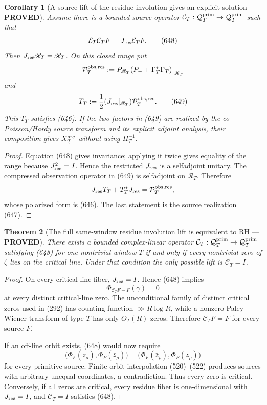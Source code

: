 \documentclass[11pt]{article}
\newtheorem{theorem}{Theorem}
\newtheorem{corollary}[theorem]{Corollary}
\newcommand{\PROVED}{\textcolor{green!45!black}{\textbf{PROVED}}}
\begin{document}
\begin{corollary}[A source lift of the residue involution gives an explicit
solution --- \PROVED]
Assume there is a bounded source operator
\(\mathcal C_T:\mathcal Q_T^{\rm prim}\to
\mathcal Q_T^{\rm prim}\) such that
\begin{equation}
 \mathcal E_T\mathcal C_TF
 =J_{\rm res}\mathcal E_TF.                          \tag{648}
\end{equation}
Then \(J_{\rm res}\mathscr R_T=\mathscr R_T\).  On this closed range put
\[
 \mathcal P_T^{\rm obs,res}:=
 P_{\mathscr R_T}
 (P_-+\Gamma_T^*\Gamma_T)\big|_{\mathscr R_T}
\]
and
\begin{equation}
 T_T:=\frac12
 (J_{\rm res}|_{\mathscr R_T})
 \mathcal P_T^{\rm obs,res}.                         \tag{649}
\end{equation}
This \(T_T\) satisfies (646).  If the two factors in (649) are realized by
the co-Poisson/Hardy source transform and its explicit adjoint analysis,
their composition gives \(X_T^{\rm src}\) without using \(H_T^{-1}\).
\end{corollary}

\begin{proof}
Equation (648) gives invariance; applying it twice gives equality of the
range because \(J_{\rm res}^2=I\).  Hence the restricted \(J_{\rm res}\)
is a selfadjoint unitary.  The compressed observation operator in (649) is
selfadjoint on \(\mathscr R_T\).  Therefore
\[
 J_{\rm res}T_T+T_T^*J_{\rm res}
 =\mathcal P_T^{\rm obs,res},
\]
whose polarized form is (646).  The last statement is the source
realization (647).
\end{proof}

\begin{theorem}[The full same-window residue involution lift is equivalent
to RH --- \PROVED]
There exists a bounded complex-linear operator
\(\mathcal C_T:\mathcal Q_T^{\rm prim}\to
\mathcal Q_T^{\rm prim}\) satisfying (648) for one nontrivial window \(T\)
if and only if every nontrivial zero of \(\zeta\) lies on the critical
line.  Under that condition the only possible lift is
\(\mathcal C_T=I\).
\end{theorem}

\begin{proof}
On every critical-line fiber, \(J_{\rm res}=I\).  Hence (648) implies
\[
 \Phi_{\mathcal C_TF-F}(\gamma)=0
\]
at every distinct critical-line zero.  The unconditional family of
distinct critical zeros used in (292) has counting function
\(\gg R\log R\), while a nonzero Paley--Wiener transform of type \(T\)
has only \(O_T(R)\) zeros.  Therefore
\(\mathcal C_TF=F\) for every source \(F\).

If an off-line orbit exists, (648) would now require
\[
 \bigl(\Phi_F(z_\rho),\Phi_F(\bar z_\rho)\bigr)
 =\bigl(\Phi_F(\bar z_\rho),\Phi_F(z_\rho)\bigr)
\]
for every primitive source.  Finite-orbit interpolation (520)--(522)
produces sources with arbitrary unequal coordinates, a contradiction.
Thus every zero is critical.  Conversely, if all zeros are critical, every
residue fiber is one-dimensional with \(J_{\rm res}=I\), and
\(\mathcal C_T=I\) satisfies (648).
\end{proof}
\end{document}
